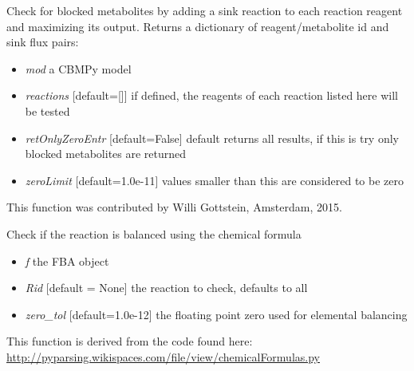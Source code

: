 \documentclass[a4paper,11pt,english]{sphinxmanual}
\begin{document}
\begin{fulllineitems}
\label{modules_doc:cbmpy.CBTools.checkProducibilityReactions}
Check for blocked metabolites by adding a sink reaction to each reaction reagent and maximizing
its output. Returns a dictionary of reagent/metabolite id and sink flux pairs:
\begin{itemize}
\item {} 
\emph{mod} a CBMPy model

\item {} 
\emph{reactions} {[}default={[}{]}{]} if defined, the reagents of each reaction listed here will be tested

\item {} 
\emph{retOnlyZeroEntr} {[}default=False{]} default returns all results, if this is try only blocked metabolites are returned

\item {} 
\emph{zeroLimit} {[}default=1.0e-11{]} values smaller than this are considered to be zero

\end{itemize}

This function was contributed by Willi Gottstein, Amsterdam, 2015.

\end{fulllineitems}


\begin{fulllineitems}
\label{modules_doc:cbmpy.CBTools.checkReactionBalanceElemental}
Check if the reaction is balanced using the chemical formula
\begin{itemize}
\item {} 
\emph{f} the FBA object

\item {} 
\emph{Rid} {[}default = None{]} the reaction to check, defaults to all

\item {} 
\emph{zero\_tol} {[}default=1.0e-12{]} the floating point zero used for elemental balancing

\end{itemize}

This function is derived from the code found here: \href{http://pyparsing.wikispaces.com/file/view/chemicalFormulas.py}{http://pyparsing.wikispaces.com/file/view/chemicalFormulas.py}

\end{fulllineitems}
\end{document}
